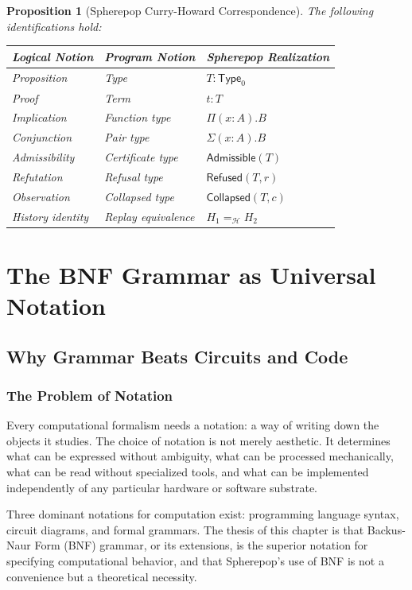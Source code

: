 \documentclass[12pt, a4paper, openany]{book}
\theoremstyle{plain}
\newtheorem{proposition}[theorem]{Proposition}
\theoremstyle{definition}
\theoremstyle{remark}
\newcommand{\Adm}{\mathsf{Admissible}}
\newcommand{\Rfsd}{\mathsf{Refused}}
\newcommand{\Col}{\mathsf{Collapsed}}
\begin{document}
\begin{proposition}[Spherepop Curry-Howard Correspondence]
The following identifications hold:
\begin{center}
\begin{tabular}{lll}
\toprule
Logical Notion & Program Notion & Spherepop Realization \\
\midrule
Proposition & Type & $T : \mathsf{Type}_0$ \\
Proof & Term & $t : T$ \\
Implication & Function type & $\Pi(x:A).B$ \\
Conjunction & Pair type & $\Sigma(x:A).B$ \\
Admissibility & Certificate type & $\Adm(T)$ \\
Refutation & Refusal type & $\Rfsd(T, r)$ \\
Observation & Collapsed type & $\Col(T, c)$ \\
History identity & Replay equivalence & $H_1 =_\mathcal{H} H_2$ \\
\bottomrule
\end{tabular}
\end{center}
\end{proposition}

\part{The BNF Grammar as Universal Notation}

\chapter{Why Grammar Beats Circuits and Code}

\section{The Problem of Notation}

Every computational formalism needs a notation: a way of writing down the objects
it studies. The choice of notation is not merely aesthetic. It determines what
can be expressed without ambiguity, what can be processed mechanically, what can
be read without specialized tools, and what can be implemented independently of
any particular hardware or software substrate.

Three dominant notations for computation exist: programming language syntax,
circuit diagrams, and formal grammars. The thesis of this chapter is that
Backus-Naur Form (BNF) grammar, or its extensions, is the superior notation for
specifying computational behavior, and that Spherepop's use of BNF is not a
convenience but a theoretical necessity.
\end{document}
